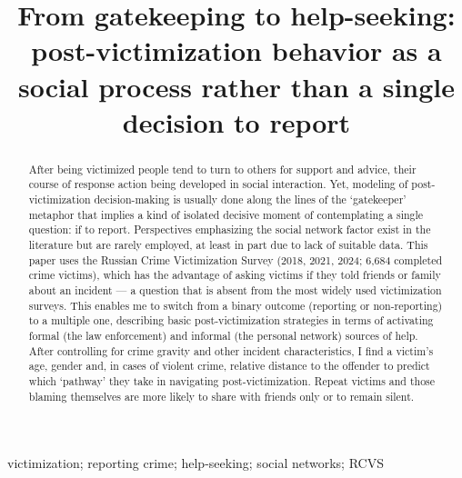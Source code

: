 \documentclass[]{interact}
\theoremstyle{plain}%
\theoremstyle{definition}
\theoremstyle{remark}
\begin{document}
	
	
	\title{From gatekeeping to help-seeking: post-victimization behavior as a social process rather than a single decision to report}
	
	\author{
	}
	
	
	\maketitle
	
	\begin{abstract}
		After being victimized people tend to turn to others for support and advice, their course of response action being developed in social interaction. Yet, modeling of post-victimization decision-making is usually done along the lines of the `gatekeeper' metaphor that implies a kind of isolated decisive moment of contemplating a single question: if to report. Perspectives emphasizing the social network factor exist in the literature but are rarely employed, at least in part due to lack of suitable data. This paper uses the Russian Crime Victimization Survey (2018, 2021, 2024; 6,684 completed crime victims), which has the advantage of asking victims if they told friends or family about an incident --- a question that is absent from the most widely used victimization surveys. This enables me to switch from a binary outcome (reporting or non-reporting) to a multiple one, describing basic post-victimization strategies in terms of activating formal (the law enforcement) and informal (the personal network) sources of help. After controlling for crime gravity and other incident characteristics, I find a victim's age, gender and, in cases of violent crime, relative distance to the offender to predict which `pathway' they take in navigating post-victimization. Repeat victims and those blaming themselves are more likely to share with friends only or to remain silent.
	\end{abstract}
	
	\begin{keywords}
		victimization; reporting crime; help-seeking; social networks; RCVS
	\end{keywords}
	
\end{document}

